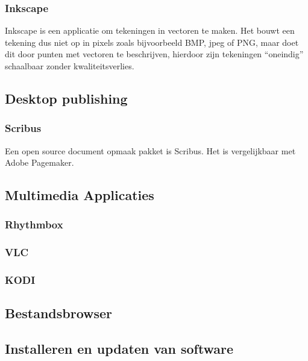 \subsubsection[Inkscape]{ Inkscape}
\hypertarget{RefHeadingToc24561698778599}{}{
Inkscape is een applicatie om tekeningen in vectoren te maken. Het bouwt een tekening dus niet op in
pixels zoals bijvoorbeeld BMP, jpeg of PNG, maar doet dit door punten met vectoren te beschrijven, hierdoor zijn
tekeningen ``oneindig'' schaalbaar zonder kwaliteitsverlies.}

\subsection[Desktop publishing]{Desktop publishing}
\hypertarget{RefHeadingToc21442520829451}{}\subsubsection[Scribus]{ Scribus}
\hypertarget{RefHeadingToc24581698778599}{}{
Een open source document opmaak pakket is Scribus. Het is vergelijkbaar met Adobe Pagemaker.}

\subsection[Multimedia Applicaties]{\sffamily Multimedia Applicaties}
\hypertarget{RefHeadingToc6804303847364}{}\subsubsection{Rhythmbox}
\hypertarget{RefHeadingToc6806303847364}{}\subsubsection{VLC}
\hypertarget{RefHeadingToc6808303847364}{}\subsubsection{KODI}
\hypertarget{RefHeadingToc6810303847364}{}\subsection[Bestandsbrowser]{Bestandsbrowser}
\hypertarget{RefHeadingToc6812303847364}{}\subsection[Installeren en updaten van software]{
Installeren en updaten van software}
\hypertarget{RefHeadingToc24861698778599}{}

